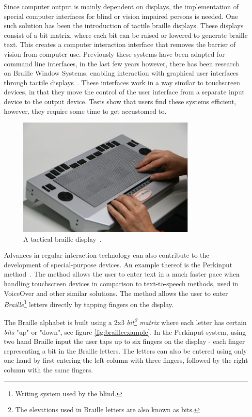 Since computer output is mainly dependent on displays, the implementation of special computer interfaces for blind or vision impaired persons is needed. One such solution has been the introduction of tactile braille displays. These displays consist of a bit matrix, where each bit can be raised or lowered to generate braille text. This creates a computer interaction interface that removes the barrier of vision from computer use. Previously these systems have been adapted for command line interfaces, in the last few years however, there has been research on Braille Window Systems, enabling interaction with graphical user interfaces through tactile displays~\cite{prescher2010tactile, conf/petra/SturmSKJ09}. These interfaces work in a way similar to touchscreen devices, in that they move the control of the user interface from a separate input device to the output device. Tests show that users find these systems efficient, however, they require some time to get accustomed to.

\begin{figure}[h!]
\includegraphics[width=0.8\textwidth] {bilder/IMG_7722.JPG}
\caption{A tactical braille display~\cite{brailledisplay}.}
\label{brailledisplay}
\end{figure}



Advances in regular interaction technology can also contribute to the development of special-purpose devices. An example thereof is the Perkinput method~\cite{azenkot}. The method allows the user to enter text in a much faster pace when handling touchscreen devices in comparison to text-to-speech methods, used in VoiceOver and other similar solutions. The method allows the user to enter \emph{Braille}\footnote{Writing system used by the blind.} letters directly by tapping fingers on the display.

The Braille alphabet is built using a 2x3 \emph{bit\footnote{The elevations used in Braille letters are also known as bits.} matrix} where each letter has certain \emph{bits} "up" or "down", see figure \ref{fig:brailleexample}. In the Perkinput system, using two hand Braille input the user taps up to six fingers on the display - each finger representing a bit in the Braille letters. The letters can also be entered using only one hand by first entering the left column with three fingers, followed by the right column with the same fingers.

